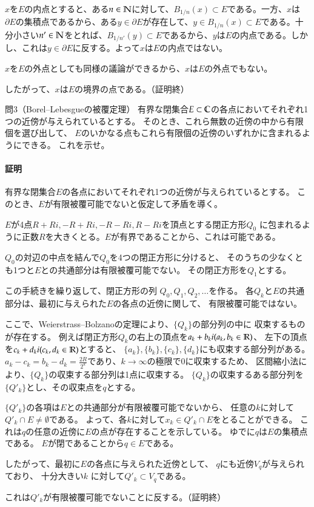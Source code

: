 $x$を$E$の内点とすると、ある$n\in\mathbb{N}$に対して、$B_{1/n}(x)\subset E$である。一方、$x$は$\partial E$の集積点であるから、ある$y\in\partial E$が存在して、$y\in B_{1/n}(x)\subset E$である。十分小さい$n'\in\mathbb{N}$をとれば、$B_{1/n'}(y)\subset E$であるから、$y$は$E$の内点である。しかし、これは$y\in\partial E$に反する。よって$x$は$E$の内点ではない。

$x$を$E$の外点としても同様の議論ができるから、$x$は$E$の外点でもない。

したがって、$x$は$E$の境界の点である。（証明終）

\begin{mysimplebox}{問3（Borel--Lebesgueの被覆定理）}
    有界な閉集合$E\subset\mathbb{C}$の各点においてそれぞれ1つの近傍が与えられているとする。
    そのとき、これら無数の近傍の中から有限個を選び出して、
    $E$のいかなる点もこれら有限個の近傍のいずれかに含まれるようにできる。
    これを示せ。
\end{mysimplebox}
\paragraph{証明}
有界な閉集合$E$の各点においてそれぞれ1つの近傍が与えられているとする。
このとき、$E$が有限被覆可能でないと仮定して矛盾を導く。

$E$が4点$R+Ri, -R+Ri, -R-Ri, R-Ri$を頂点とする閉正方形$Q_0$
に包まれるように正数$R$を大きくとる。$E$が有界であることから、これは可能である。

$Q_0$の対辺の中点を結んで$Q_0$を4つの閉正方形に分けると、
そのうちの少なくとも1つと$E$との共通部分は有限被覆可能でない。
その閉正方形を$Q_1$とする。

この手続きを繰り返して、閉正方形の列
$Q_0, Q_1, Q_2,\dots$を作る。
各$Q_k$と$E$の共通部分は、最初に与えられた$E$の各点の近傍に関して、
有限被覆可能ではない。

ここで、Weierstrass--Bolzanoの定理により、$\{Q_k\}$の部分列の中に
収束するものが存在する。
例えば閉正方形$Q_k$の右上の頂点を$a_k+b_{k}i (a_k,b_k\in\mathbb{R})$、
左下の頂点を$c_k+d_{k}i (c_k,d_k\in\mathbb{R})$とすると、
$\{a_k\}, \{b_k\},\{c_k\},\{d_k\}$にも収束する部分列がある。
$a_k-c_k=b_k-d_k=\frac{2R}{2^k}$であり、$k\longrightarrow\infty$の極限で0に収束するため、
区間縮小法により、$\{Q_k\}$の収束する部分列は1点に収束する。
$\{Q_k\}$の収束するある部分列を$\{Q'_k\}$とし、その収束点を$q$とする。

$\{Q'_k\}$の各項は$E$との共通部分が有限被覆可能でないから、
任意の$k$に対して$Q'_k\cap E\neq\emptyset$である。
よって、各$k$に対して$x_k\in Q'_k\cap E$をとることができる。
これは$q$の任意の近傍に$E$の点が存在することを示している。
ゆでに$q$は$E$の集積点である。
$E$が閉であることから$q\in E$である。

したがって、最初に$E$の各点に与えられた近傍として、
$q$にも近傍$V_q$が与えられており、
十分大きい$k$ に対して$Q'_k\subset V_q$である。

これは$Q'_k$が有限被覆可能でないことに反する。（証明終）

